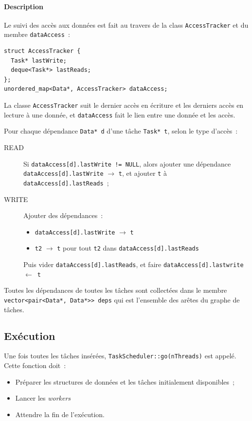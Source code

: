 \documentclass[11pt]{article}
\theoremstyle{plain} %
\theoremstyle{definition} %
\begin{document}
\paragraph{Description}
\label{sec:description}
Le suivi des accès aux données est fait au travers de la class \texttt{AccessTracker} et du membre \texttt{dataAccess}~:
\begin{lstlisting}
struct AccessTracker {
  Task* lastWrite;
  deque<Task*> lastReads;
};
unordered_map<Data*, AccessTracker> dataAccess;
\end{lstlisting}
La classe \texttt{AccessTracker} suit le dernier accès en écriture et les derniers accès en lecture à une donnée, et \texttt{dataAccess} fait le lien entre une donnée et les accès.

Pour chaque dépendance \texttt{Data* d} d'une tâche \texttt{Task* t}, selon le type d'accès~:
\begin{description}
\item[READ] Si \texttt{dataAccess[d].lastWrite != NULL}, alors ajouter une dépendance \texttt{dataAccess[d].lastWrite} $\to$ \texttt{t}, et ajouter \texttt{t} à \texttt{dataAccess[d].lastReads}~;
\item[WRITE] Ajouter des dépendances~:
  \begin{itemize}
  \item \texttt{dataAccess[d].lastWrite} $\to$ \texttt{t}
  \item \texttt{t2} $\to$ \texttt{t} pour tout \texttt{t2} dans \texttt{dataAccess[d].lastReads}
  \end{itemize}
  Puis vider \texttt{dataAccess[d].lastReads}, et faire \texttt{dataAccess[d].lastwrite}~$\gets$~\texttt{t}
\end{description}

Toutes les dépendances de toutes les tâches sont collectées dans le membre \texttt{vector<pair<Data*, Data*>{}> deps} qui est l'ensemble des arêtes du graphe de tâches.

\subsection{Exécution}
\label{sec:execution}
Une fois toutes les tâches insérées, \texttt{TaskScheduler::go(nThreads)} est appelé.
Cette fonction doit~:
\begin{itemize}
\item Préparer les structures de données et les tâches initialement disponibles~;
\item Lancer les \emph{workers}
\item Attendre la fin de l'exécution.
\end{itemize}
\end{document}
